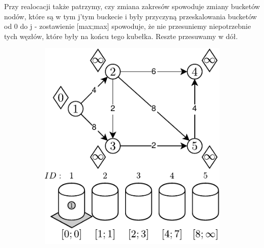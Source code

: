  Przy realocacji także patrzymy, czy zmiana zakresów spowoduje zmiany bucketów nodów, które są w tym j'tym buckecie i były przyczyną przeskalowania bucketów od 0 do j - zostawienie [max;max] spowoduje, że nie przesuniemy niepotrzebnie tych węzłów, które były na końcu tego kubełka. Reszte przesuwamy w dół.



\begin{figure}[!htbp]
	\centering
	\begin{subfigure}[b]{0.3\textwidth}
		\includegraphics[width=\textwidth]{Chapter_II/8/a.pdf}
		\caption{}
	\end{subfigure}
	\begin{subfigure}[b]{0.3\textwidth}

\end{subfigure}
\end{figure}
